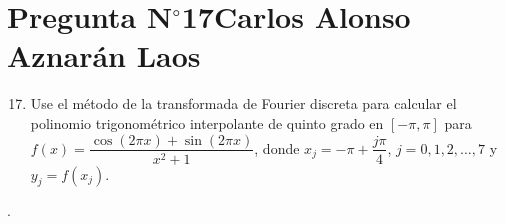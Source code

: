 \section{Pregunta N$^{\circ}$17\qquad Carlos Alonso Aznarán Laos}

\begin{frame}
    \begin{enumerate}\setcounter{enumi}{16}
        \item

              Use el método de la transformada de Fourier discreta
              para calcular el polinomio trigonométrico interpolante
              de quinto grado en $\left[-\pi,\pi\right]$ para
              \begin{math}
                  f\left(x\right)=
                  \dfrac{
                      \cos\left(2\pi x\right)+
                      \sin\left(2\pi x\right)
                  }{x^{2}+1}
              \end{math},
              donde
              \begin{math}
                  x_{j}=
                  -\pi+
                  \dfrac{j\pi}{4}
              \end{math},
              \begin{math}
                  j=0,1,2,\dotsc,7
              \end{math}
              y
              \begin{math}
                  y_{j}=
                  f\left(x_{j}\right)
              \end{math}.
    \end{enumerate}

    \begin{solution}
        .
    \end{solution}
\end{frame}

